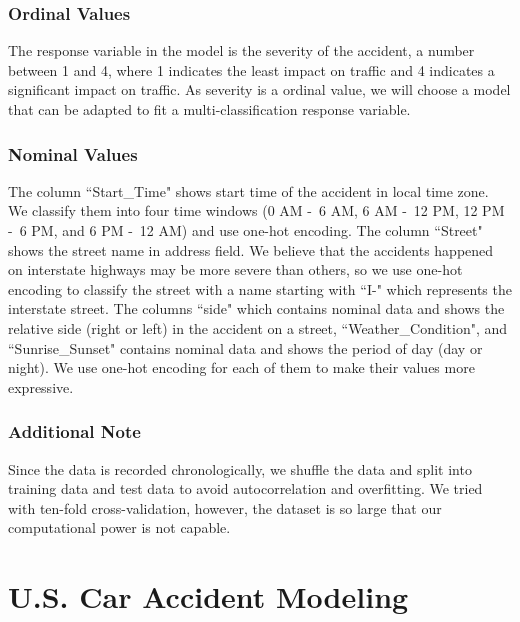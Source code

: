 \documentclass[twocolumn]{article}
\begin{document}
\subsubsection{Ordinal Values}
The response variable in the model is the severity of the accident, a number between 1 and 4, where 1 indicates the least impact on traffic and 4 indicates a significant impact on traffic. As severity is a ordinal value, we will choose a model that can be adapted to fit a multi-classification response variable.
\subsubsection{Nominal Values}
The column “Start\_Time" shows start time of the accident in local time zone. We classify them into four time windows (0 AM -\ 6 AM, 6 AM -\ 12 PM, 12 PM -\ 6 PM, and 6 PM -\ 12 AM) and use one-hot encoding. The column “Street" shows the street name in address field. We believe that the accidents happened on interstate highways may be more severe than others, so we use one-hot encoding to classify the street with a name starting  with “I-" which represents the interstate street. The columns “side" which contains nominal data and shows the relative side (right or left) in the accident on a street, “Weather\_Condition", and “Sunrise\_Sunset" contains nominal data and shows the period of day (day or night). We use one-hot encoding for each of them to make their values more expressive.

\subsubsection{Additional Note}
Since the data is recorded chronologically, we shuffle the data and split into training data and test data to avoid autocorrelation and overfitting. We tried with ten-fold cross-validation, however, the dataset is so large that our computational power is not capable. 

\section{U.S. Car Accident Modeling}
\end{document}
